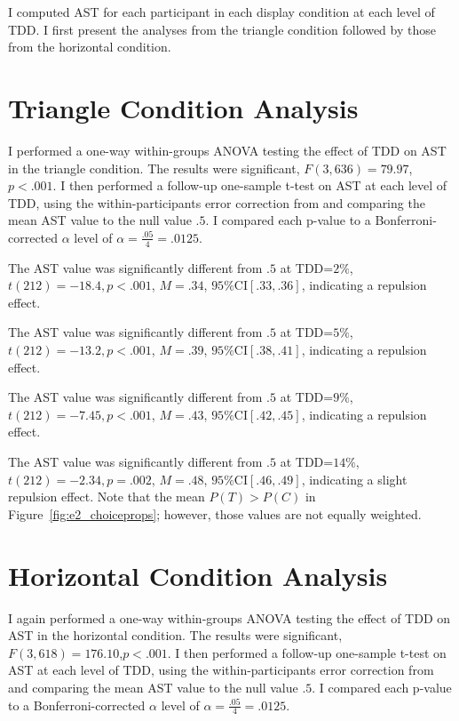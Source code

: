 I computed AST for each participant in each display condition at each level of TDD. I first present the analyses from the triangle condition followed by those from the horizontal condition. 

\section{Triangle Condition Analysis}
I performed a one-way within-groups ANOVA testing the effect of TDD on AST in the triangle condition. The results were significant, $\textit{F}(3,636)=79.97$,$\textit{p}<.001$. 
I then performed a follow-up one-sample t-test on AST at each level of TDD, using the within-participants error correction from \textcite{cousineau2014error} and comparing the mean AST value to the null value $.5$. I compared each p-value to a Bonferroni-corrected $\alpha$ level of $\alpha=\frac{.05}{4}=.0125$. 

The AST value was significantly different from $.5$ at TDD=$2\%$, $\textit{t}(212)=-18.4,\textit{p}<.001$, $\textit{M}=.34$, $95\%\text{CI}[.33,.36]$, indicating a repulsion effect. 

The AST value was significantly different from $.5$ at TDD=$5\%$, $\textit{t}(212)=-13.2,\textit{p}<.001$, $\textit{M}=.39$, $95\%\text{CI}[.38,.41]$, indicating a repulsion effect. 

The AST value was significantly different from $.5$ at TDD=$9\%$, $\textit{t}(212)=-7.45,\textit{p}<.001$, $\textit{M}=.43$, $95\%\text{CI}[.42,.45]$, indicating a repulsion effect. 

The AST value was significantly different from $.5$ at TDD=$14\%$, $\textit{t}(212)=-2.34,\textit{p}=.002$, $\textit{M}=.48$, $95\%\text{CI}[.46,.49]$, indicating a slight repulsion effect. Note that the mean $P(T)>P(C)$ in Figure~\ref{fig:e2_choiceprops}; however, those values are not equally weighted.

\section{Horizontal Condition Analysis}
I again performed a one-way within-groups ANOVA testing the effect of TDD on AST in the horizontal condition. The results were significant, $\textit{F}(3,618)=176.10$,$\textit{p}<.001$. 
I then performed a follow-up one-sample t-test on AST at each level of TDD, using the within-participants error correction from \textcite{cousineau2014error} and comparing the mean AST value to the null value $.5$. I compared each p-value to a Bonferroni-corrected $\alpha$ level of $\alpha=\frac{.05}{4}=.0125$. 

